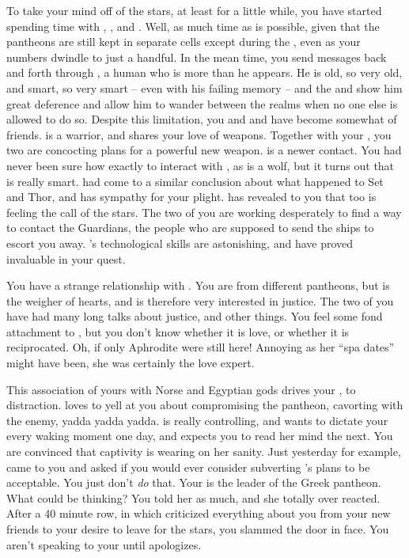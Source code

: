 \documentclass[char]{guardians}
\begin{document}
To take your mind off of the stars, at least for a little while, you have started spending time with \cVal{}, \cFenrir{}, and \cAnubis{}. Well, as much time as is possible, given that the pantheons are still kept in separate cells except during the \pGames{}, even as your numbers dwindle to just a handful. In the mean time, you send messages back and forth through \cJascha{}, a human who is more than he appears. He is old, so very old, and smart, so very smart -- even with his failing memory -- and the \cWarden{} and \cCaretaker{} show him great deference and allow him to wander between the realms when no one else is allowed to do so.  Despite this limitation, you and \cFenrir{} and \cVal{} have become somewhat of friends. \cVal{} is a warrior, and shares your love of weapons. Together with your \cHephaestus{\sibling}, \cHephaestus{} you two are concocting plans for a powerful new weapon. \cFenrir{} is a newer contact. You had never been sure how exactly to interact with \cFenrir{\them}, as \cFenrir{\they} is a wolf, but it turns out that \cFenrir{\they} is really smart. \cFenrir{} had come to a similar conclusion about what happened to Set and Thor, and has sympathy for your plight. \cFenrir{} has revealed to you that \cFenrir{\they} too is feeling the call of the stars. The two of you are working desperately to find a way to contact the Guardians, the people who are supposed to send the ships to escort you away. \cFenrir{}'s technological skills are astonishing, and have proved invaluable in your quest.

You have a strange relationship with \cAnubis{}. You are from different pantheons, but \cAnubis{\they} is the weigher of hearts, and is therefore very interested in justice. The two of you have had many long talks about justice, and other things. You feel some fond attachment to \cAnubis{\them}, but you don't know whether it is love, or whether it is reciprocated. Oh, if only Aphrodite were still here! Annoying as her ``spa dates'' might have been, she was certainly the love expert.

This association of yours with Norse and Egyptian gods drives your \cHera{\parent}, \cHera{} to distraction. \cHera{\They} loves to yell at you about compromising the pantheon, cavorting with the enemy, yadda yadda yadda. \cHera{\They} is really controlling, and wants to dictate your every waking moment one day, and expects you to read her mind the next. You are convinced that captivity is wearing on her sanity. Just yesterday for example, \cHera{} came to you and asked if you would ever consider subverting \cZeus{}'s plans to be acceptable. You just don't \emph{do} that. Your \cZeus{\parent} is the leader of the Greek pantheon. What could \cHera{} be thinking? You told her as much, and she totally over reacted.  After a 40 minute row, in which \cHera{} criticized everything about you from your new friends to your desire to leave for the stars, you slammed the door in \cHera{\them} face. You aren't speaking to your \cHera{\parent} until \cHera{\they} apologizes.
\end{document}
